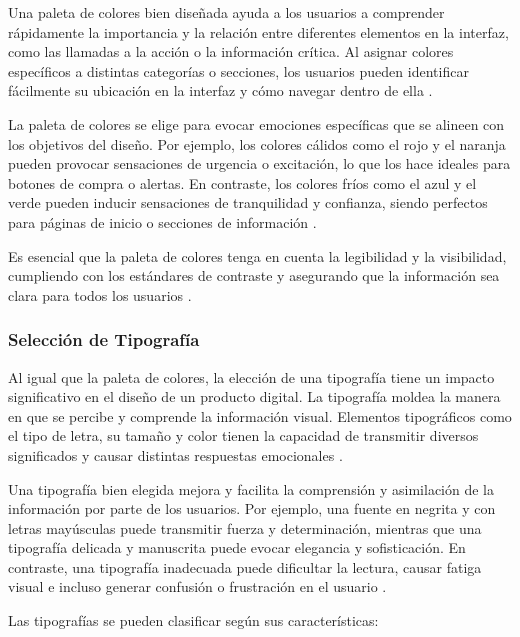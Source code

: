 Una paleta de colores bien diseñada ayuda a los usuarios a comprender rápidamente la importancia y la relación entre diferentes elementos en la interfaz, como las llamadas a la acción o la información crítica. Al asignar colores específicos a distintas categorías o secciones, los usuarios pueden identificar fácilmente su ubicación en la interfaz y cómo navegar dentro de ella \cite{EspacioUXSF}.

La paleta de colores se elige para evocar emociones específicas que se alineen con los objetivos del diseño. Por ejemplo, los colores cálidos como el rojo y el naranja pueden provocar sensaciones de urgencia o excitación, lo que los hace ideales para botones de compra o alertas. En contraste, los colores fríos como el azul y el verde pueden inducir sensaciones de tranquilidad y confianza, siendo perfectos para páginas de inicio o secciones de información \cite{EspacioUXSF}.

Es esencial que la paleta de colores tenga en cuenta la legibilidad y la visibilidad, cumpliendo con los estándares de contraste y asegurando que la información sea clara para todos los usuarios \cite{EspacioUXSF}.

\subsubsection{Selección de Tipografía}
Al igual que la paleta de colores, la elección de una tipografía tiene un impacto significativo en el diseño de un producto digital. La tipografía moldea la manera en que se percibe y comprende la información visual. Elementos tipográficos como el tipo de letra, su tamaño y color tienen la capacidad de transmitir diversos significados y causar distintas respuestas emocionales \cite{CamaraSevilla2023}.

Una tipografía bien elegida mejora y facilita la comprensión y asimilación de la información por parte de los usuarios. Por ejemplo, una fuente en negrita y con letras mayúsculas puede transmitir fuerza y determinación, mientras que una tipografía delicada y manuscrita puede evocar elegancia y sofisticación. En contraste, una tipografía inadecuada puede dificultar la lectura, causar fatiga visual e incluso generar confusión o frustración en el usuario \cite{CamaraSevilla2023}.

Las tipografías se pueden clasificar según sus características:

